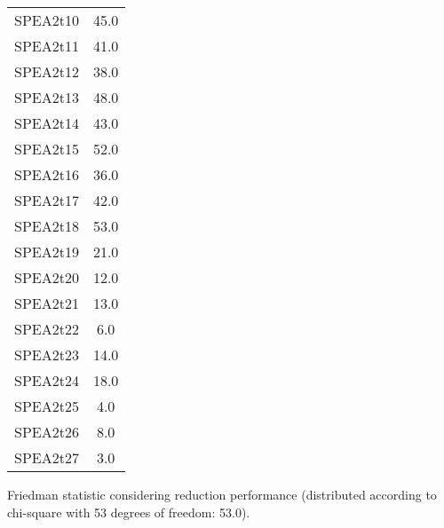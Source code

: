 \documentclass{article}
\begin{document}
\begin{table}[!htp]
\begin{tabular}{c|c}
SPEA2t10&45.0\\
SPEA2t11&41.0\\
SPEA2t12&38.0\\
SPEA2t13&48.0\\
SPEA2t14&43.0\\
SPEA2t15&52.0\\
SPEA2t16&36.0\\
SPEA2t17&42.0\\
SPEA2t18&53.0\\
SPEA2t19&21.0\\
SPEA2t20&12.0\\
SPEA2t21&13.0\\
SPEA2t22&6.0\\
SPEA2t23&14.0\\
SPEA2t24&18.0\\
SPEA2t25&4.0\\
SPEA2t26&8.0\\
SPEA2t27&3.0\\
\end{tabular}
\end{table}


Friedman statistic considering reduction performance (distributed according to chi-square with 53 degrees of freedom: 53.0).
\end{document}
